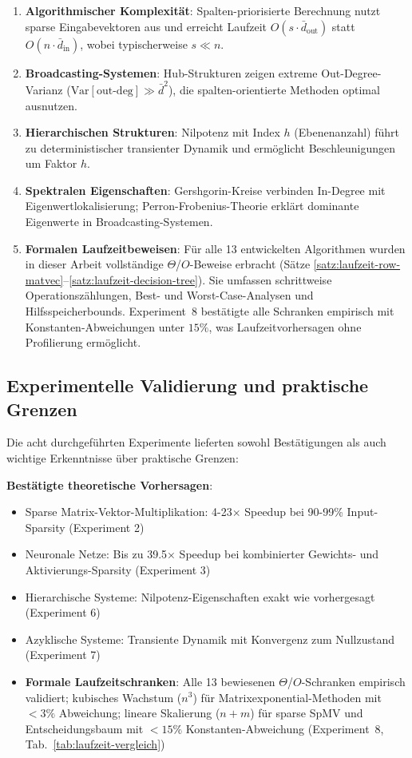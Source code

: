 \documentclass[a4paper,12pt]{report}
\theoremstyle{definition}
\begin{document}
	\begin{enumerate}
		\item \textbf{Algorithmischer Komplexität}: Spalten-priorisierte Berechnung nutzt sparse Eingabevektoren aus und erreicht Laufzeit $O(s \cdot \bar{d}_{\text{out}})$ statt $O(n \cdot \bar{d}_{\text{in}})$, wobei typischerweise $s \ll n$.
		
		\item \textbf{Broadcasting-Systemen}: Hub-Strukturen zeigen extreme Out-Degree-Varianz ($\text{Var}[\text{out-deg}] \gg \bar{d}^2$), die spalten-orientierte Methoden optimal ausnutzen.
		
		\item \textbf{Hierarchischen Strukturen}: Nilpotenz mit Index $h$ (Ebenenanzahl) führt zu deterministischer transienter Dynamik und ermöglicht Beschleunigungen um Faktor $h$.
		
		\item \textbf{Spektralen Eigenschaften}: Gershgorin-Kreise verbinden In-Degree mit Eigenwertlokalisierung; Perron-Frobenius-Theorie erklärt dominante Eigenwerte in Broadcasting-Systemen.

		\item \textbf{Formalen Laufzeitbeweisen}: Für alle 13 entwickelten Algorithmen wurden in dieser Arbeit vollständige $\Theta$/$O$-Beweise erbracht (Sätze \ref{satz:laufzeit-row-matvec}--\ref{satz:laufzeit-decision-tree}). Sie umfassen schrittweise Operationszählungen, Best- und Worst-Case-Analysen und Hilfsspeicherbounds. Experiment~8 bestätigte alle Schranken empirisch mit Konstanten-Abweichungen unter $15\%$, was Laufzeitvorhersagen ohne Profilierung ermöglicht.
	\end{enumerate}
	
	\subsection{Experimentelle Validierung und praktische Grenzen}
	
	Die acht durchgeführten Experimente lieferten sowohl Bestätigungen als auch wichtige Erkenntnisse über praktische Grenzen:
	
	\textbf{Bestätigte theoretische Vorhersagen}:
	\begin{itemize}
		\item Sparse Matrix-Vektor-Multiplikation: 4-23$\times$ Speedup bei 90-99\% Input-Sparsity (Experiment 2)
		\item Neuronale Netze: Bis zu 39.5$\times$ Speedup bei kombinierter Gewichts- und Aktivierungs-Sparsity (Experiment 3)
		\item Hierarchische Systeme: Nilpotenz-Eigenschaften exakt wie vorhergesagt (Experiment 6)
		\item Azyklische Systeme: Transiente Dynamik mit Konvergenz zum Nullzustand (Experiment 7)
		\item \textbf{Formale Laufzeitschranken}: Alle 13 bewiesenen $\Theta$/$O$-Schranken empirisch validiert; kubisches Wachstum ($n^3$) für Matrixexponential-Methoden mit $< 3\%$ Abweichung; lineare Skalierung ($n{+}m$) für sparse SpMV und Entscheidungsbaum mit $< 15\%$ Konstanten-Abweichung (Experiment~8, Tab.~\ref{tab:laufzeit-vergleich})
	\end{itemize}
	
\end{document}
